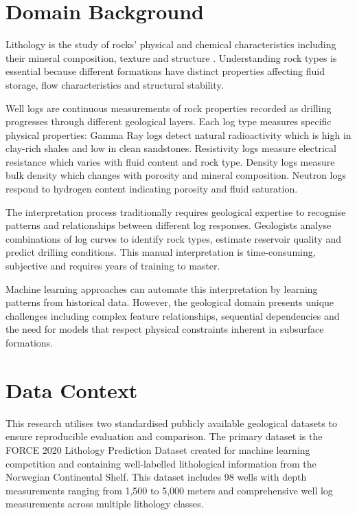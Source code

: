 \section{Domain Background}

Lithology is the study of rocks' physical and chemical characteristics including their mineral composition, texture and structure \parencite{Boggs2009}. Understanding rock types is essential because different formations have distinct properties affecting fluid storage, flow characteristics and structural stability.

Well logs are continuous measurements of rock properties recorded as drilling progresses through different geological layers. Each log type measures specific physical properties: Gamma Ray logs detect natural radioactivity which is high in clay-rich shales and low in clean sandstones. Resistivity logs measure electrical resistance which varies with fluid content and rock type. Density logs measure bulk density which changes with porosity and mineral composition. Neutron logs respond to hydrogen content indicating porosity and fluid saturation.

The interpretation process traditionally requires geological expertise to recognise patterns and relationships between different log responses. Geologists analyse combinations of log curves to identify rock types, estimate reservoir quality and predict drilling conditions. This manual interpretation is time-consuming, subjective and requires years of training to master.

Machine learning approaches can automate this interpretation by learning patterns from historical data. However, the geological domain presents unique challenges including complex feature relationships, sequential dependencies and the need for models that respect physical constraints inherent in subsurface formations.


\section{Data Context}

This research utilises two standardised publicly available geological datasets to ensure reproducible evaluation and comparison. The primary dataset is the FORCE 2020 Lithology Prediction Dataset created for machine learning competition and containing well-labelled lithological information from the Norwegian Continental Shelf. This dataset includes 98 wells with depth measurements ranging from 1,500 to 5,000 meters and comprehensive well log measurements across multiple lithology classes.

